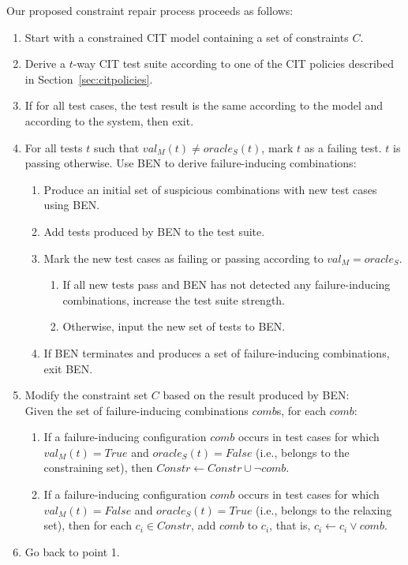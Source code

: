 \begin{tikzborder}{\cite{Gargantini16:validation}}
\begin{tikzborder}{\cite{gargantini_combinatorial_2017}}
\begin{tikzborder}{\cite{gargantini_combinatorial_2017}}
Our proposed constraint repair process proceeds as follows:
\begin{enumerate}
	\item Start with a constrained CIT model containing a set of constraints $C$.
	\item Derive a $t$-way CIT test suite according to one of the CIT policies described in Section~\ref{sec:citpolicies}.
	\item If for all test cases, the test result is the same according to the model and according to the system, then exit.
	\item For all tests $t$ such that $val_M(t) \neq \mathit{oracle}_{S}(t)$, mark $t$ as a failing test. $t$ is passing otherwise. Use BEN to derive failure-inducing combinations:
	\begin{enumerate}
		\item Produce an initial set of suspicious combinations with new test cases using BEN.
		\item Add tests produced by BEN to the test suite. 
		\item Mark the new test cases as failing or passing according to $val_{M}=\mathit{oracle}_{S}$.
		\begin{enumerate}
			\item If all new tests pass and BEN has not detected any failure-inducing combinations, increase the test suite strength. %
			\item Otherwise, input the new set of tests to BEN.
		\end{enumerate}
		\item If BEN terminates and produces a set of failure-inducing combinations, exit BEN.
	\end{enumerate}
	\item Modify the constraint set $C$ based on the result produced by BEN: \\
	Given the set of failure-inducing combinations $comb$s, for each $comb$:
	\begin{enumerate} 
		\item If a failure-inducing configuration $comb$ occurs in test cases for which $val_M(t)=\mathit{True}$ and $\mathit{oracle}_{S}(t)=\mathit{False}$ (i.e., belongs to the constraining set), then $\mathit{Constr}\leftarrow \mathit{Constr} \cup \neg comb$.
		\item If a failure-inducing configuration $comb$ occurs in test cases for which $val_M(t)=\mathit{False}$ and $\mathit{oracle}_{S}(t)=\mathit{True}$ (i.e., belongs to the relaxing set), then for each $c_i \in \mathit{Constr}$, add $comb$ to $c_i$, that is, $c_i \leftarrow c_i \vee comb$.
	\end{enumerate}
	\item Go back to point 1. 
\end{enumerate}




\end{tikzborder}
\end{tikzborder}
\end{tikzborder}
